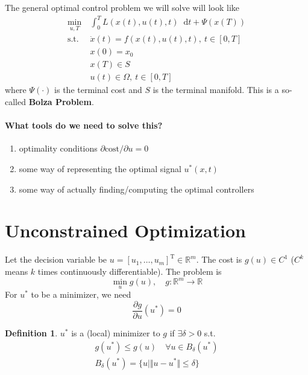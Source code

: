 \documentclass[letterpaper,12pt,titlepage]{report}
\newcommand*\dif{\mathop{}\!\mathrm{d}}
\newcommand{\trans}{^\text{T}}
\newcommand*\pder[2]{\frac{\partial #1}{\partial #2}}
\theoremstyle{plain}
\theoremstyle{definition}
\newtheorem*{defi}{Definition}
\begin{document}
The general optimal control problem we will solve will look like
\begin{align}
  \min_{u,T} {}\ & \int_0^T\! L(x(t),u(t),t) \dif t + \Psi(x(T)) \\
  \text{s.t. } & \dot{x}(t) = f(x(t),u(t),t),\ t\in[0,T] \\
                 & x(0) = x_0 \\
                 & x(T) \in S \\
                 & u(t) \in \Omega,\ t\in[0,T]
\end{align}
where $\Psi(\cdot)$ is the terminal cost and $S$ is the terminal manifold. This is a so-called \textbf{Bolza Problem}.

\paragraph{What tools do we need to solve this?}
\begin{enumerate}
\item optimality conditions $\partial\text{cost}/\partial u=0$
\item some way of representing the optimal signal $u^*(x,t)$
\item some way of actually finding/computing the optimal controllers
\end{enumerate}

\section{Unconstrained Optimization}

Let the decision variable be $u=[u_1, \dots, u_m]\trans\in\mathbb R^m$. The cost is $g(u)\in C^1$ ($C^k$ means $k$ times continuously differentiable). The problem is
\[ \min_u g(u), \quad g:\mathbb R^m \to \mathbb R \]
For $u^*$ to be a minimizer, we need
\[ \pder{g}{u} (u^*) = 0 \]
\begin{defi}
  $u^*$ is a (local) minimizer to $g$ if $\exists\delta>0$ s.t.
  \begin{gather}
    g(u^*) \le g(u) \quad \forall u\in B_\delta(u^*) \\
    B_\delta(u^*) = \{ u \mid \Vert u-u^* \Vert \le \delta \}
  \end{gather}
\end{defi}
\end{document}

